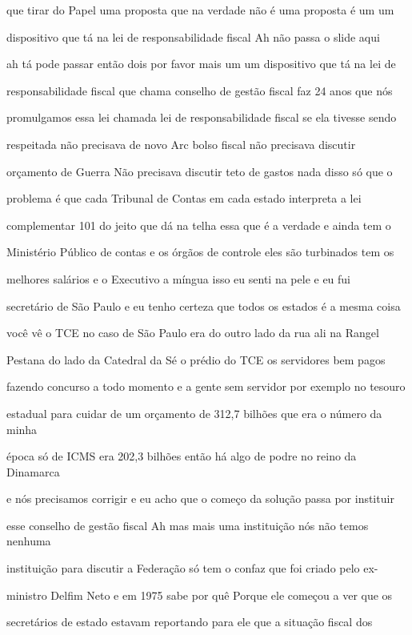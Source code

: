 \documentclass[a4paper,12pt]{article}
\begin{document}
que tirar do Papel uma proposta que na verdade não é uma proposta é um um

dispositivo que tá na lei de responsabilidade fiscal Ah não passa o slide aqui

ah tá pode passar então dois por favor mais um um dispositivo que tá na lei de

responsabilidade fiscal que chama conselho de gestão fiscal faz 24 anos que nós

promulgamos essa lei chamada lei de responsabilidade fiscal se ela tivesse sendo

respeitada não precisava de novo Arc bolso fiscal não precisava discutir

orçamento de Guerra Não precisava discutir teto de gastos nada disso só que o

problema é que cada Tribunal de Contas em cada estado interpreta a lei

complementar 101 do jeito que dá na telha essa que é a verdade e ainda tem o

Ministério Público de contas e os órgãos de controle eles são turbinados tem os

melhores salários e o Executivo a míngua isso eu senti na pele e eu fui

secretário de São Paulo e eu tenho certeza que todos os estados é a mesma coisa

você vê o TCE no caso de São Paulo era do outro lado da rua ali na Rangel

Pestana do lado da Catedral da Sé o prédio do TCE os servidores bem pagos

fazendo concurso a todo momento e a gente sem servidor por exemplo no tesouro

estadual para cuidar de um orçamento de 312,7 bilhões que era o número da minha

época só de ICMS era 202,3 bilhões então há algo de podre no reino da Dinamarca

e nós precisamos corrigir e eu acho que o começo da solução passa por instituir

esse conselho de gestão fiscal Ah mas mais uma instituição nós não temos nenhuma

instituição para discutir a Federação só tem o confaz que foi criado pelo ex-

ministro Delfim Neto e em 1975 sabe por quê Porque ele começou a ver que os

secretários de estado estavam reportando para ele que a situação fiscal dos
\end{document}
